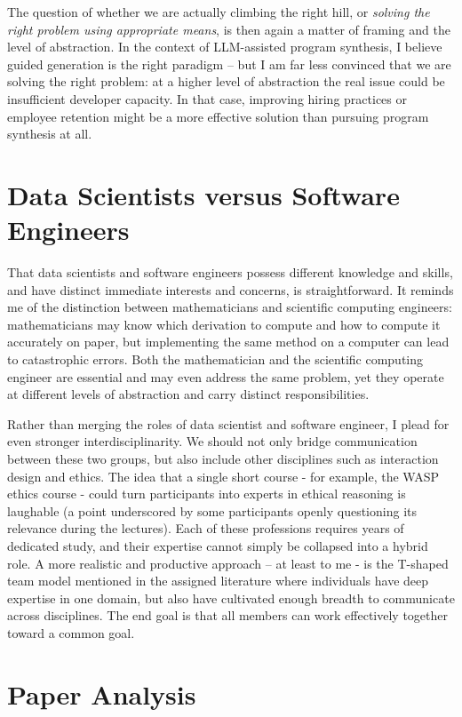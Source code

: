 \documentclass[a4paper, 11pt]{article}
\begin{document}
The question of whether we are actually climbing the right hill, or \emph{solving the right problem using appropriate means}, is then again  a matter of framing and the level of abstraction. In the context of LLM-assisted program synthesis, I believe guided generation is the right paradigm – but I am far less convinced that we are solving the right problem: at a higher level of abstraction the real issue could be insufficient developer capacity. In that case, improving hiring practices or employee retention might be a more effective solution than pursuing program synthesis at all.


\section{Data Scientists versus Software Engineers}
That data scientists and software engineers possess different knowledge and skills, and have distinct immediate interests and concerns, is straightforward. It reminds me of the distinction between mathematicians and scientific computing engineers: mathematicians may know which derivation to compute and how to compute it accurately on paper, but implementing the same method on a computer can lead to catastrophic errors. Both the mathematician and the scientific computing engineer are essential and may even address the same problem, yet they operate at different levels of abstraction and carry distinct responsibilities.

Rather than merging the roles of data scientist and software engineer, I plead for even stronger interdisciplinarity. We should not only bridge communication between these two groups, but also include other disciplines such as interaction design and ethics. The idea that a single short course - for example, the WASP ethics course - could turn participants into experts in ethical reasoning is laughable (a point underscored by some participants openly questioning its relevance during the lectures). Each of these professions requires years of dedicated study, and their expertise cannot simply be collapsed into a hybrid role. A more realistic and productive approach – at least to me - is the T-shaped team model mentioned in the assigned literature where individuals have deep expertise in one domain, but also have cultivated enough breadth to communicate across disciplines. The end goal is that all members can work effectively together toward a common goal.

\section{Paper Analysis}
\end{document}
